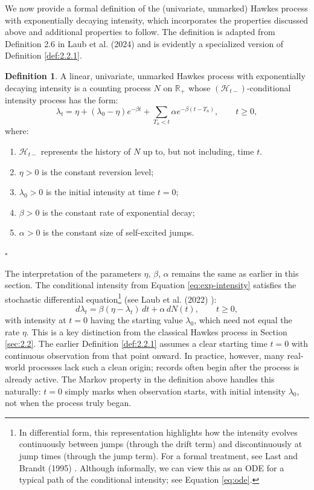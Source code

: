 \documentclass[12pt,a4paper]{report}
\theoremstyle{plain}
\theoremstyle{definition}
\newtheorem{definition}{Definition}[section]
\theoremstyle{remark}
\newcommand{\1}{\mathbf{1}}
\begin{document}
\medskip
\noindent
We now provide a formal definition of the (univariate, unmarked) Hawkes process with exponentially decaying intensity, which incorporates the properties discussed above and additional properties to follow. The definition is adapted from Definition 2.6 in Laub et al. (2024) \cite{LLPT24} and is evidently a specialized version of Definition \ref{def:2.2.1}.
\begin{definition}\label{def:exp-HP}
A linear, univariate, unmarked Hawkes process with exponentially decaying intensity is a counting process $N$ on $\mathbb{R}_+$ whose $(\mathcal{H}_{t-})$-conditional intensity process has the form:
\begin{equation}\label{eq:exp-intensity}
\lambda_t = \eta + (\lambda_0 - \eta) e^{-\beta t} + \sum_{T_n < t} \alpha e^{-\beta(t-T_n)}, \qquad t\ge0,
\end{equation}
where:
\begin{enumerate}
    \item $\mathcal{H}_{t-}$ represents the history of $N$ up to, but not including, time $t$.
    \item $\eta > 0$ is the constant reversion level;
    \item $\lambda_0 > 0$ is the initial intensity at time $t=0$;
    \item $\beta > 0$ is the constant rate of exponential decay;
    \item $\alpha > 0$ is the constant size of self-excited jumps.
\end{enumerate}
\hfill $\square$
\end{definition}
\noindent
The interpretation of the parameters $\eta$, $\beta$, $\alpha$ remains the same as earlier in this section. The conditional intensity from Equation \eqref{eq:exp-intensity} satisfies the stochastic differential equation\footnote{In differential form, this representation highlights how the intensity evolves continuously between jumps (through the drift term) and discontinuously at jump times (through the jump term). For a formal treatment, see Last and Brandt (1995) \cite{LB95}. Although informally, we can view this as an ODE for a typical path of the conditional intensity; see Equation \eqref{eq:ode}.} (see Laub et al. (2022) \cite{LLT22}):
\begin{equation}
d\lambda_t = \beta(\eta - \lambda_t) \, dt + \alpha \, dN(t), \qquad t \geq 0,
\end{equation}
with intensity at $t=0$ having the starting value $\lambda_0$, which need not equal the rate $\eta$. This is a key distinction from the classical Hawkes process in Section \ref{sec:2.2}. The earlier Definition \ref{def:2.2.1} assumes a clear starting time $t = 0$ with continuous observation from that point onward. In practice, however, many real-world processes lack such a clean origin; records often begin after the process is already active. The Markov property in the definition above handles this naturally: $t = 0$ simply marks when observation starts, with initial intensity $\lambda_0$, not when the process truly began.
\end{document}
